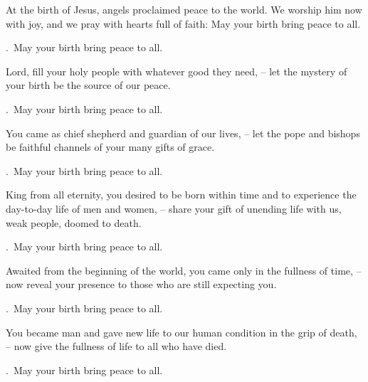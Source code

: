 \lettrine[loversize=0.15,lines=2]{A}{}t the birth of Jesus, angels proclaimed peace to the world. We worship him now with joy, and we pray with hearts full of faith: May your birth bring peace to all.
\par \Rbar.~May your birth bring peace to all.

Lord, fill your holy people with whatever good they need,
– let the mystery of your birth be the source of our peace.
\par \Rbar.~May your birth bring peace to all.

You came as chief shepherd and guardian of our lives,
– let the pope and bishops be faithful channels of your many gifts of grace.
\par \Rbar.~May your birth bring peace to all.

King from all eternity, you desired to be born within time and to experience the day-to-day life of men and women,
– share your gift of unending life with us, weak people, doomed to death.
\par \Rbar.~May your birth bring peace to all.

Awaited from the beginning of the world, you came only in the fullness of time,
– now reveal your presence to those who are still expecting you.
\par \Rbar.~May your birth bring peace to all.

You became man and gave new life to our human condition in the grip of death,
– now give the fullness of life to all who have died.
\par \Rbar.~May your birth bring peace to all.
